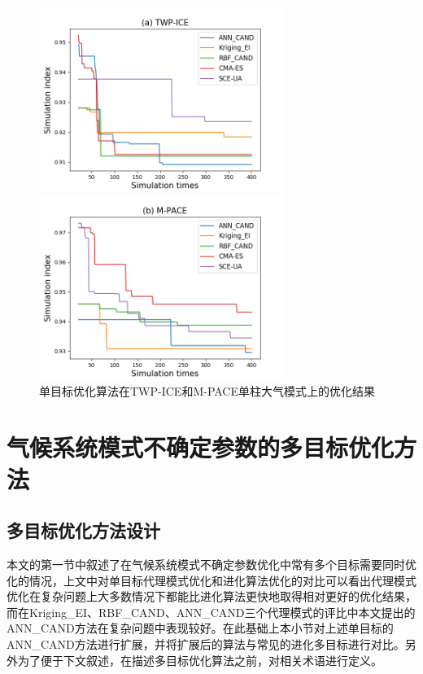 \begin{figure}[H]
\centering
\begin{minipage}[t]{0.48\textwidth}
\centering
\includegraphics[width=8cm]{figures/twpicescam.png}
\end{minipage}
\begin{minipage}[t]{0.48\textwidth}
\centering
\includegraphics[width=8cm]{figures/mpacescam.png}
\end{minipage}
\caption{单目标优化算法在TWP-ICE和M-PACE单柱大气模式上的优化结果}
\label{fig:soscam}
\end{figure}

\section{气候系统模式不确定参数的多目标优化方法}
\subsection{多目标优化方法设计}
本文的第一节中叙述了在气候系统模式不确定参数优化中常有多个目标需要同时优化的情况，上文中对单目标代理模式优化和进化算法优化的对比可以看出代理模式优化在复杂问题上大多数情况下都能比进化算法更快地取得相对更好的优化结果，而在Kriging\_EI、RBF\_CAND、ANN\_CAND三个代理模式的评比中本文提出的ANN\_CAND方法在复杂问题中表现较好。在此基础上本小节对上述单目标的ANN\_CAND方法进行扩展，并将扩展后的算法与常见的进化多目标进行对比。另外为了便于下文叙述，在描述多目标优化算法之前，对相关术语进行定义。

